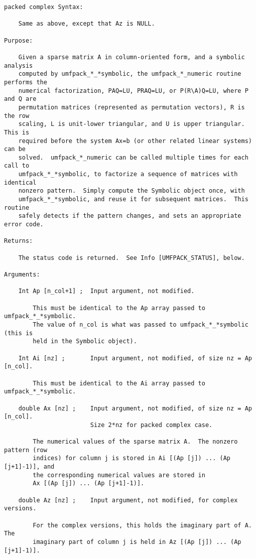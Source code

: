 \documentclass[11pt]{article}
\begin{document}
{\begin{verbatim}
packed complex Syntax:

    Same as above, except that Az is NULL.

Purpose:

    Given a sparse matrix A in column-oriented form, and a symbolic analysis
    computed by umfpack_*_*symbolic, the umfpack_*_numeric routine performs the
    numerical factorization, PAQ=LU, PRAQ=LU, or P(R\A)Q=LU, where P and Q are
    permutation matrices (represented as permutation vectors), R is the row
    scaling, L is unit-lower triangular, and U is upper triangular.  This is
    required before the system Ax=b (or other related linear systems) can be
    solved.  umfpack_*_numeric can be called multiple times for each call to
    umfpack_*_*symbolic, to factorize a sequence of matrices with identical
    nonzero pattern.  Simply compute the Symbolic object once, with
    umfpack_*_*symbolic, and reuse it for subsequent matrices.  This routine
    safely detects if the pattern changes, and sets an appropriate error code.

Returns:

    The status code is returned.  See Info [UMFPACK_STATUS], below.

Arguments:

    Int Ap [n_col+1] ;  Input argument, not modified.

        This must be identical to the Ap array passed to umfpack_*_*symbolic.
        The value of n_col is what was passed to umfpack_*_*symbolic (this is
        held in the Symbolic object).

    Int Ai [nz] ;       Input argument, not modified, of size nz = Ap [n_col].

        This must be identical to the Ai array passed to umfpack_*_*symbolic.

    double Ax [nz] ;    Input argument, not modified, of size nz = Ap [n_col].
                        Size 2*nz for packed complex case.

        The numerical values of the sparse matrix A.  The nonzero pattern (row
        indices) for column j is stored in Ai [(Ap [j]) ... (Ap [j+1]-1)], and
        the corresponding numerical values are stored in
        Ax [(Ap [j]) ... (Ap [j+1]-1)].

    double Az [nz] ;    Input argument, not modified, for complex versions.

        For the complex versions, this holds the imaginary part of A.  The
        imaginary part of column j is held in Az [(Ap [j]) ... (Ap [j+1]-1)].


\end{verbatim}}
\end{document}
